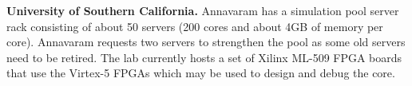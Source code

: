 \vspace{3pt}
\noindent
\textbf{University of Southern California.}
Annavaram has a simulation pool server rack consisting of about 50 servers (200 cores and about 4GB of memory per core). 
Annavaram requests two servers to strengthen the pool as some old servers need to be retired. %
The lab currently hosts a set of Xilinx ML-509 FPGA boards that use the Virtex-5 FPGAs which may be used to design and debug the core. 
